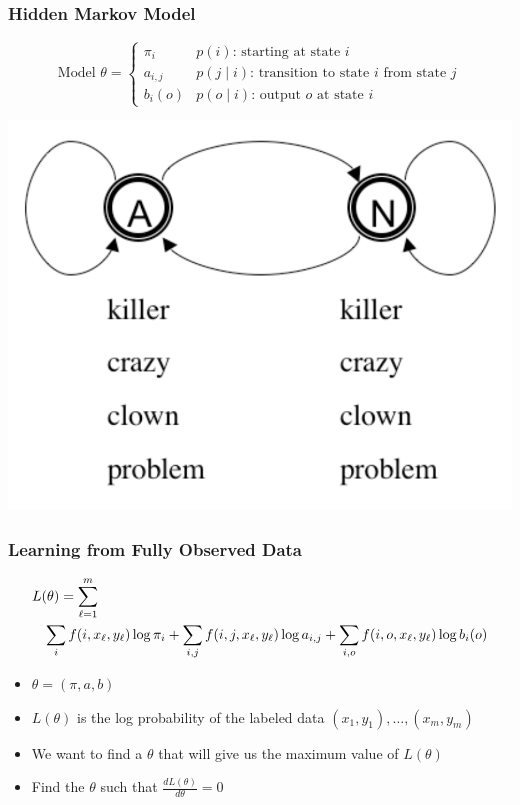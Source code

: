\begin{frame}
\frametitle{Hidden Markov Model}
\[
\textrm{Model $\theta$} = \left\{ 
\begin{array}{ll} 
\pi_i & \textrm{$p(i)$: starting at state $i$} \\ 
a_{i,j} & \textrm{$p(j \mid i)$: transition to state $i$ from state $j$} \\ 
b_i(o) & \textrm{$p( o \mid i)$: output $o$ at state $i$}
\end{array} 
\right.\]

\begin{center}
\includegraphics[scale=.4]{figures/hmmfig}
\end{center}
\end{frame}

\begin{frame}
\frametitle{Learning from Fully Observed Data}
{\small\begin{eqnarray*}
\lefteqn{L(\theta) = \sum_{\ell=1}^m  } \\
&& \sum_{i} f(i,x_\ell,y_\ell) \log \pi_i + \sum_{i,j} f(i,j,x_\ell,y_\ell) \log a_{i,j} + \sum_{i,o} f(i,o,x_\ell,y_\ell) \log b_i(o) \end{eqnarray*}}
\begin{itemize}[<+->]
\item $\theta = \left( \pi, a, b \right)$
\item $L(\theta)$ is the log probability of the labeled data $(x_1, y_1), \ldots, (x_m, y_m)$ 
\item We want to find a $\theta$ that will give us the maximum value of $L(\theta)$
\item Find the $\theta$ such that $\frac{d L(\theta)}{d \theta} = 0$ 
\end{itemize}
\end{frame}

